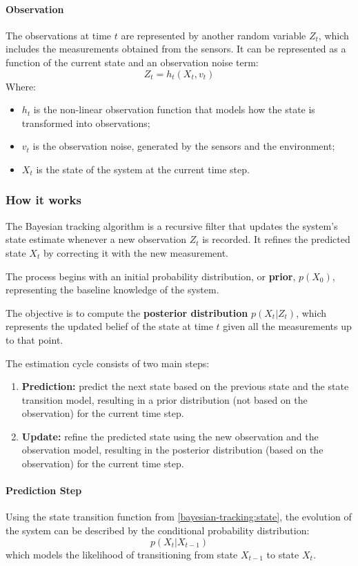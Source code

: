 \paragraph{Observation}
\label{bayesian-tracking:observation}
The observations at time $t$ are represented by another random variable $Z_t$, which includes the measurements obtained from the sensors.
It can be represented as a function of the current state and an observation noise term:
$$Z_t = h_t(X_t, v_t)$$
Where:
\begin{itemize}
    \item $h_t$ is the non-linear observation function that models how the state is transformed into observations;
    \item $v_t$ is the observation noise, generated by the sensors and the environment;
    \item $X_t$ is the state of the system at the current time step.
\end{itemize}

\subsubsection{How it works}
The Bayesian tracking algorithm is a recursive filter that updates the system's state estimate whenever a 
new observation $Z_t$ is recorded. It refines the predicted state $X_t$ by correcting it with the new measurement.

The process begins with an initial probability distribution, or \textbf{prior}, $p(X_0)$, 
representing the baseline knowledge of the system. 

The objective is to compute the \textbf{posterior distribution} $p(X_t | Z_{t})$, which represents the updated belief of the state at time 
$t$ given all the measurements up to that point.

The estimation cycle consists of two main steps:
\begin{enumerate}
    \item \textbf{Prediction:} predict the next state based on the previous state and the state transition model, 
    resulting in a prior distribution (not based on the observation) for the current time step.
    \item \textbf{Update:} refine the predicted state using the new observation and the observation model, 
    resulting in the posterior distribution (based on the observation) for the current time step.
\end{enumerate}

\paragraph{Prediction Step}
Using the state transition function from \ref{bayesian-tracking:state}, the evolution of the system can be described by the conditional probability distribution:
$$p(X_t | X_{t-1})$$
which models the likelihood of transitioning from state $X_{t-1}$ to state $X_t$.

